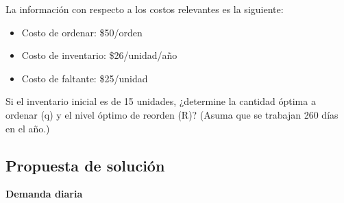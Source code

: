 \documentclass[12pt, a4paper]{article}
\begin{document}
La información con respecto a los costos relevantes es la siguiente:

\begin{itemize}
    \item Costo de ordenar: \$50/orden
    \item Costo de inventario: \$26/unidad/año
    \item Costo de faltante: \$25/unidad
\end{itemize}

Si el inventario inicial es de 15 unidades, ¿determine la cantidad óptima a ordenar (q) y el nivel óptimo de reorden (R)? (Asuma que se trabajan 260 días en el año.)

\subsection{Propuesta de solución}

\textbf{Demanda diaria}
\end{document}
